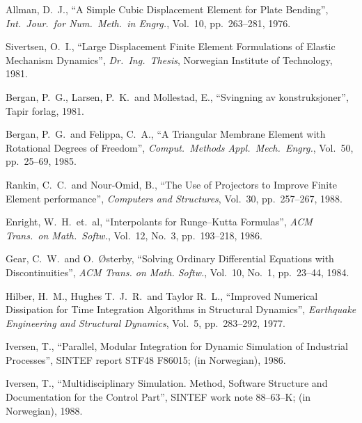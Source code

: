 %
%

%
%

\begin{thebibliography}{99}

Allman, D.\ J.,
``A Simple Cubic Displacement Element for Plate Bending'',
\textit{Int.\ Jour.\ for Num.\ Meth.\ in Engrg.},
Vol.\ 10, pp.\ 263--281, 1976.

Sivertsen, O.\ I.,
``Large Displacement Finite Element Formulations of Elastic Mechanism Dynamics'',
\textit{Dr.\ Ing.\ Thesis},
Norwegian Institute of Technology, 1981.

Bergan, P.\ G., Larsen, P.\ K.\ and Mollestad, E.,
``Svingning av konstruksjoner'',
Tapir forlag, 1981.

Bergan, P.\ G.\ and Felippa, C.\ A.,
``A Triangular Membrane Element with Rotational Degrees of Freedom'',
\textit{Comput.\ Methods Appl.\ Mech.\ Engrg.},
Vol.\ 50, pp.\ 25--69, 1985.

Rankin, C.\ C.\ and Nour-Omid, B.,
``The Use of Projectors to Improve Finite Element performance'',
\textit{Computers and Structures},
Vol.\ 30, pp.\ 257--267, 1988.

Enright, W.\ H.\ et.\ al,
``Interpolants for Runge--Kutta Formulas'',
\textit{ACM Trans.\ on Math.\ Softw.},
Vol.\ 12, No.\ 3, pp.\ 193--218, 1986.

Gear, C.\ W.\ and O.\ {\O}sterby,
``Solving Ordinary Differential Equations with Discontinuities'',
\textit{ACM Trans. on Math. Softw.},
Vol.\ 10, No.\ 1, pp.\ 23--44, 1984.

Hilber, H.\ M., Hughes T.\ J.\ R.\ and Taylor R.\ L.,
``Improved Numerical Dissipation for Time Integration Algorithms in Structural Dynamics'',
\textit{Earthquake Engineering and Structural Dynamics},
Vol.\ 5, pp.\ 283--292, 1977.

Iversen, T.,
``Parallel, Modular Integration for Dynamic Simulation of Industrial Processes'',
SINTEF report STF48 F86015; (in Norwegian), 1986.

Iversen, T.,
``Multidisciplinary Simulation. Method, Software Structure and Documentation for the Control Part'',
SINTEF work note 88--63--K; (in Norwegian), 1988.


\end{thebibliography}

